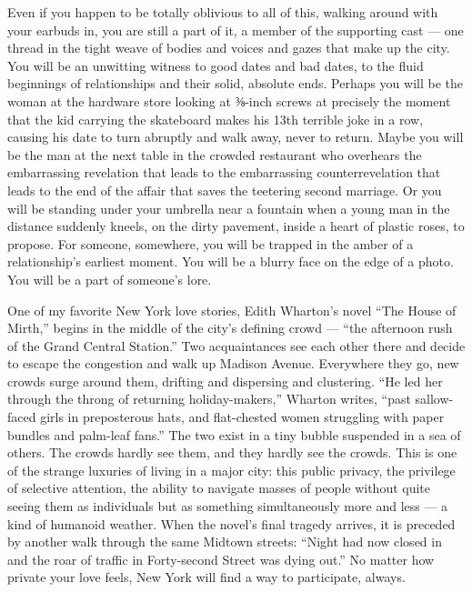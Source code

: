 Even if you happen to be totally oblivious to all of this, walking
around with your earbuds in, you are still a part of it, a member of the
supporting cast --- one thread in the tight weave of bodies and voices
and gazes that make up the city. You will be an unwitting witness to
good dates and bad dates, to the fluid beginnings of relationships and
their solid, absolute ends. Perhaps you will be the woman at the
hardware store looking at ⅜-inch screws at precisely the moment that the
kid carrying the skateboard makes his 13th terrible joke in a row,
causing his date to turn abruptly and walk away, never to return. Maybe
you will be the man at the next table in the crowded restaurant who
overhears the embarrassing revelation that leads to the embarrassing
counterrevelation that leads to the end of the affair that saves the
teetering second marriage. Or you will be standing under your umbrella
near a fountain when a young man in the distance suddenly kneels, on the
dirty pavement, inside a heart of plastic roses, to propose. For
someone, somewhere, you will be trapped in the amber of a relationship's
earliest moment. You will be a blurry face on the edge of a photo. You
will be a part of someone's lore.

One of my favorite New York love stories, Edith Wharton's novel ``The
House of Mirth,'' begins in the middle of the city's defining crowd ---
``the afternoon rush of the Grand Central Station.'' Two acquaintances
see each other there and decide to escape the congestion and walk up
Madison Avenue. Everywhere they go, new crowds surge around them,
drifting and dispersing and clustering. ``He led her through the throng
of returning holiday-makers,'' Wharton writes, ``past sallow-faced girls
in preposterous hats, and flat-chested women struggling with paper
bundles and palm-leaf fans.'' The two exist in a tiny bubble suspended
in a sea of others. The crowds hardly see them, and they hardly see the
crowds. This is one of the strange luxuries of living in a major city:
this public privacy, the privilege of selective attention, the ability
to navigate masses of people without quite seeing them as individuals
but as something simultaneously more and less --- a kind of humanoid
weather. When the novel's final tragedy arrives, it is preceded by
another walk through the same Midtown streets: ``Night had now closed in
and the roar of traffic in Forty-second Street was dying out.'' No
matter how private your love feels, New York will find a way to
participate, always.

